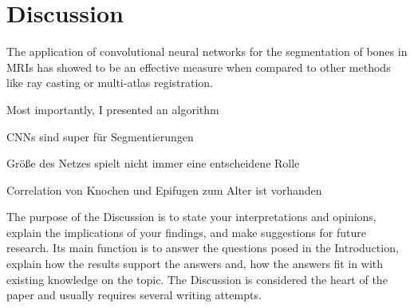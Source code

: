 \section{Discussion}

The application of convolutional neural networks for the segmentation of bones in MRIs has showed to be an effective measure when compared to other methods like ray casting or multi-atlas registration.

Most importantly, I presented an algorithm




CNNs sind super für Segmentierungen

Größe des Netzes spielt nicht immer eine entscheidene Rolle

Correlation von Knochen und Epifugen zum Alter ist vorhanden




The purpose of the Discussion is to state your interpretations and opinions, explain the implications of your findings, and make suggestions for future research. Its main function is to answer the questions posed in the Introduction, explain how the results support the answers and, how the answers fit in with existing knowledge on the topic. The Discussion is considered the heart of the paper and usually requires several writing attempts. 



\newpage
